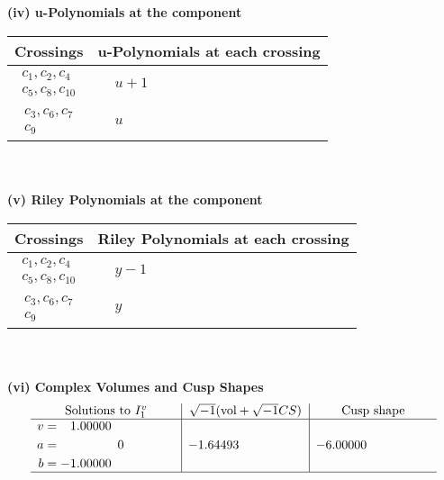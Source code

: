 \documentclass[1p]{elsarticle_modified}
\theoremstyle{definition}
\newcommand{\I}{\sqrt{-1}}
\begin{document}
\newpage\renewcommand{\arraystretch}{1}
\flushleft \textbf{(iv) u-Polynomials at the component}\newline \\
\begin{tabular}{m{50pt}|m{274pt}}
Crossings & \hspace{64pt}u-Polynomials at each crossing \\
\hline $$\begin{aligned}c_{1},c_{2},c_{4}\\c_{5},c_{8},c_{10}\end{aligned}$$&$\begin{aligned}
&u+1
\end{aligned}$\\
\hline $$\begin{aligned}c_{3},c_{6},c_{7}\\c_{9}\end{aligned}$$&$\begin{aligned}
&u
\end{aligned}$\\
\hline
\end{tabular}\\~\\
\newpage\renewcommand{\arraystretch}{1}
\flushleft \textbf{(v) Riley Polynomials at the component}\newline \\
\begin{tabular}{m{50pt}|m{274pt}}
Crossings & \hspace{64pt}Riley Polynomials at each crossing \\
\hline $$\begin{aligned}c_{1},c_{2},c_{4}\\c_{5},c_{8},c_{10}\end{aligned}$$&$\begin{aligned}
&y-1
\end{aligned}$\\
\hline $$\begin{aligned}c_{3},c_{6},c_{7}\\c_{9}\end{aligned}$$&$\begin{aligned}
&y
\end{aligned}$\\
\hline
\end{tabular}\\~\\
\newpage\flushleft \textbf{(vi) Complex Volumes and Cusp Shapes}
$$\begin{array}{c|c|c}  
\text{Solutions to }I^v_{1}& \I (\text{vol} + \sqrt{-1}CS) & \text{Cusp shape}\\
 \hline 
\begin{aligned}
v &= \phantom{-}1.00000\phantom{ +0.000000I} \\
a &= \phantom{-0.000000 } 0 \\
b &= -1.00000\phantom{ +0.000000I}\end{aligned}
 & -1.64493\phantom{ +0.000000I} & -6.00000\phantom{ +0.000000I}\\
 \hline 
 \end{array}$$\newpage
\end{document}
